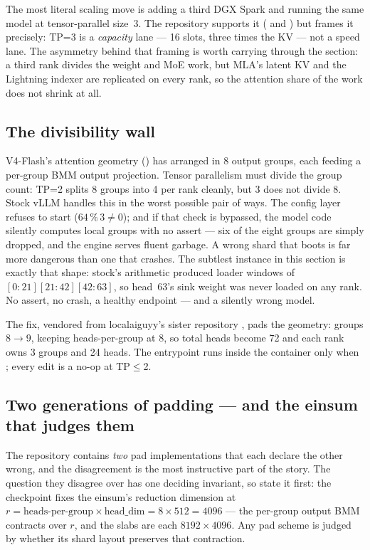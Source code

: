 The most literal scaling move is adding a third DGX Spark and running the same
model at tensor-parallel size~3. The repository supports it
( and ) but frames it precisely: TP=3 is a
\emph{capacity} lane --- 16 slots, three times the KV --- not a speed lane.
The asymmetry behind that framing is worth carrying through the section: a
third rank divides the weight and MoE work, but MLA's latent KV and the
Lightning indexer are replicated on every rank, so the attention share of the
work does not shrink at all.

\subsection{The divisibility wall}

V4-Flash's attention geometry () has
 arranged in 8 output groups, each feeding a
per-group BMM output projection. Tensor parallelism must divide the group
count: TP=2 splits 8 groups into 4 per rank cleanly, but 3 does not divide 8.
Stock vLLM handles this in the worst possible pair of ways. The config layer
refuses to start ($64 \,\%\, 3 \neq 0$); and if that check is bypassed, the
model code silently computes  local groups with no assert
--- six of the eight groups are simply dropped, and the engine serves fluent
garbage. A wrong shard that boots is far more dangerous than one that
crashes. The subtlest instance in this section is exactly that shape:
stock's  arithmetic produced  loader
windows of $[0{:}21][21{:}42][42{:}63]$, so head~63's sink weight was never
loaded on any rank. No assert, no crash, a healthy endpoint --- and a
silently wrong model.

The fix, vendored from localaiguyy's sister repository
, pads the
geometry: groups $8 \to 9$, keeping heads-per-group at 8, so total heads
become 72 and each rank owns 3 groups and 24 heads. The entrypoint runs
 inside the container only when
; every edit is a no-op at TP$\le$2.

\subsection{Two generations of padding --- and the einsum that judges them}

The repository contains \emph{two} pad implementations that each declare the other
wrong, and the disagreement is the most instructive part of the story. The
question they disagree over has one deciding invariant, so state it first:
the checkpoint fixes the  einsum's reduction dimension at
$r = \text{heads-per-group} \times \text{head\_dim} = 8 \times 512 = 4096$
--- the per-group output BMM contracts over $r$, and the  slabs
are each $8192 \times 4096$. Any pad scheme is judged by whether its shard
layout preserves that contraction.

